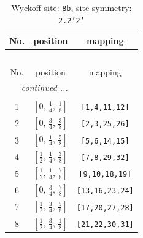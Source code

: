 \documentclass[fleqn,8pt]{jsarticle}
\begin{document}
\begin{longtable}{ccc}
\caption{Wyckoff site: {\tt 8b}, site symmetry: {\tt 2.2'2'}}
 \\
 \hline \hline
No. & position & mapping \\ \hline \endfirsthead

\multicolumn{2}{l}{\tablename\ \thetable{}} \\
 \hline \hline
No. & position & mapping \\ \hline \endhead

 \hline \hline
\multicolumn{2}{r}{\footnotesize\it continued ...} \\ \endfoot

 \hline \hline
\multicolumn{2}{r}{} \\ \endlastfoot

1 & $\left[ 0,\, \frac{1}{4},\, \frac{1}{8} \right]$ & {\tt [1,4,11,12]} \\ \hline
2 & $\left[ 0,\, \frac{3}{4},\, \frac{3}{8} \right]$ & {\tt [2,3,25,26]} \\ \hline
3 & $\left[ 0,\, \frac{1}{4},\, \frac{5}{8} \right]$ & {\tt [5,6,14,15]} \\ \hline
4 & $\left[ \frac{1}{2},\, \frac{1}{4},\, \frac{3}{8} \right]$ & {\tt [7,8,29,32]} \\ \hline
5 & $\left[ \frac{1}{2},\, \frac{1}{4},\, \frac{7}{8} \right]$ & {\tt [9,10,18,19]} \\ \hline
6 & $\left[ 0,\, \frac{3}{4},\, \frac{7}{8} \right]$ & {\tt [13,16,23,24]} \\ \hline
7 & $\left[ \frac{1}{2},\, \frac{3}{4},\, \frac{5}{8} \right]$ & {\tt [17,20,27,28]} \\ \hline
8 & $\left[ \frac{1}{2},\, \frac{3}{4},\, \frac{1}{8} \right]$ & {\tt [21,22,30,31]} \\
\end{longtable}
\renewcommand{\arraystretch}{1.2}
\end{document}
